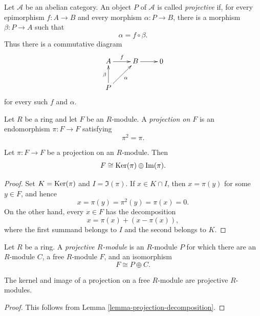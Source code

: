 \begin{definition}
\label{definition-projective}
Let $\mathcal{A}$ be an abelian category.
An object $P$ of $\mathcal{A}$ is called
{\it projective} if, for every epimorphism
$f:A\to B$ and every morphism
$\alpha:P\to B$, there is a morphism
$\beta:P\to A$ such that
$$
\alpha=f\circ\beta.
$$
Thus there is a commutative diagram
$$
\xymatrix{
A \ar[r]^f & B \ar[r] & 0 \\
P \ar[u]^{\beta} \ar[ur]_{\alpha} &
}
$$
for every such $f$ and $\alpha$.
\end{definition}

\begin{definition}
\label{definition-projection-module}
Let $R$ be a ring and let $F$ be an
$R$-module. A {\it projection on $F$} is
an endomorphism $\pi:F\to F$ satisfying
$$
\pi^2=\pi.
$$
\end{definition}

\begin{lemma}
\label{lemma-projection-decomposition}
Let $\pi:F\to F$ be a projection on an
$R$-module. Then
$$
F\cong\mathop{\mathrm{Ker}}(\pi)\oplus\mathop{\mathrm{Im}}(\pi).
$$
\end{lemma}

\begin{proof}
Set $K=\mathop{\mathrm{Ker}}(\pi)$ and $I=\Im(\pi)$.
If $x\in K\cap I$, then $x=\pi(y)$ for
some $y\in F$, and hence
$$
x=\pi(y)=\pi^2(y)=\pi(x)=0.
$$
On the other hand, every $x\in F$ has the
decomposition
$$
x=\pi(x)+(x-\pi(x)),
$$
where the first summand belongs to $I$ and
the second belongs to $K$.
\end{proof}

\begin{definition}
\label{definition-projective-direct-summand}
Let $R$ be a ring. A {\it projective
$R$-module} is an $R$-module $P$ for which
there are an $R$-module $C$, a free
$R$-module $F$, and an isomorphism
$$
F\cong P\oplus C.
$$
\end{definition}

\begin{lemma}[Corollary]
\label{lemma-projection-projective}
The kernel and image of a projection on a
free $R$-module are projective
$R$-modules.
\end{lemma}

\begin{proof}
This follows from Lemma
\ref{lemma-projection-decomposition}.
\end{proof}

